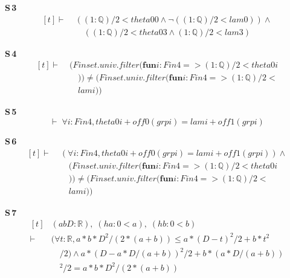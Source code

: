 \noindent\textbf{S\,3}\quad{}
{\footnotesize\[ \begin{aligned}[t]
\vdash\;&((1:\mathbb{Q} )/2 < \mathit{theta0} 0 \wedge \neg ((1:\mathbb{Q} )/2 < \mathit{lam} 0)) \wedge\\
&\quad ((1:\mathbb{Q} )/2 < \mathit{theta0} 3 \wedge (1:\mathbb{Q} )/2 < \mathit{lam} 3)
\end{aligned} \]}

\noindent\textbf{S\,4}\quad{}
{\footnotesize\[ \begin{aligned}[t]
\vdash\;&(\mathit{Finset}.\mathit{univ}.\mathit{filter} (\mathbf{fun} \mathit{i} : \mathit{Fin} 4 => (1:\mathbb{Q} )/2 < \mathit{theta0} \mathit{i}\\
&\quad )) \neq (\mathit{Finset}.\mathit{univ}.\mathit{filter} (\mathbf{fun} \mathit{i} : \mathit{Fin} 4 => (1:\mathbb{Q} )/2 <\\
&\quad \mathit{lam} \mathit{i}))
\end{aligned} \]}

\noindent\textbf{S\,5}\quad{}
{\footnotesize\[ \vdash\; \forall \mathit{i} : \mathit{Fin} 4, \mathit{theta0} \mathit{i} + \mathit{off0} (\mathit{grp} \mathit{i}) = \mathit{lam} \mathit{i} + \mathit{off1} (\mathit{grp} \mathit{i}) \]}

\noindent\textbf{S\,6}\quad{}
{\footnotesize\[ \begin{aligned}[t]
\vdash\;&(\forall \mathit{i} : \mathit{Fin} 4, \mathit{theta0} \mathit{i} + \mathit{off0} (\mathit{grp} \mathit{i}) = \mathit{lam} \mathit{i} + \mathit{off1} (\mathit{grp} \mathit{i})) \wedge\\
&\quad (\mathit{Finset}.\mathit{univ}.\mathit{filter} (\mathbf{fun} \mathit{i} : \mathit{Fin} 4 => (1:\mathbb{Q} )/2 < \mathit{theta0} \mathit{i}\\
&\quad )) \neq (\mathit{Finset}.\mathit{univ}.\mathit{filter} (\mathbf{fun} \mathit{i} : \mathit{Fin} 4 => (1:\mathbb{Q} )/2 <\\
&\quad \mathit{lam} \mathit{i}))
\end{aligned} \]}

\noindent\textbf{S\,7}\quad{}
{\footnotesize\[ \begin{aligned}[t]
&(\mathit{a} \mathit{b} \mathit{D} : \mathbb{R} ),\; (\mathit{ha} : 0 < \mathit{a}),\; (\mathit{hb} : 0 < \mathit{b})\\
\vdash\;&(\forall \mathit{t} : \mathbb{R} , \mathit{a} * \mathit{b} * \mathit{D} ^{2} / (2 * (\mathit{a} + \mathit{b})) \leq \mathit{a} * (\mathit{D} - \mathit{t}) ^{2} / 2 + \mathit{b} * \mathit{t} ^{2}\\
&\quad / 2) \wedge \mathit{a} * (\mathit{D} - \mathit{a} * \mathit{D} / (\mathit{a} + \mathit{b})) ^{2} / 2 + \mathit{b} * (\mathit{a} * \mathit{D} / (\mathit{a} + \mathit{b}))\\
&\quad ^{2} / 2 = \mathit{a} * \mathit{b} * \mathit{D} ^{2} / (2 * (\mathit{a} + \mathit{b}))
\end{aligned} \]}


